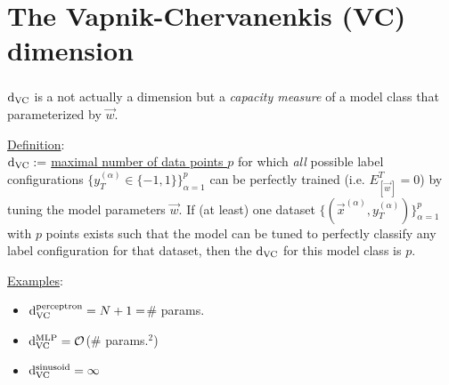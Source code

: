 \section{The Vapnik-Chervanenkis (VC) dimension}


\begin{frame}\frametitle{\secname}

$\mathrm{d}_{\mathrm{VC}}$ is a not actually a dimension but a \emph{capacity measure} 
of a model class that parameterized by $\vec w$.

\underline{Definition}:\\

$\mathrm{d}_{\mathrm{VC}} :=$ \underline{maximal number of data points $p$} for which \emph{all} possible label configurations $\{y_{T}^{(\alpha)} \in \{-1,1\}\}_{\alpha=1}^{p}$ can be perfectly trained (i.e. $E^{T}_{[\vec w]}=0$) by tuning the model parameters $\vec w$.
If (at least) one dataset $\{(\vec x^{(\alpha)}, y_{T}^{(\alpha)})\}_{\alpha=1}^{p}$ with $p$ points exists such that the model can be tuned to perfectly classify any label configuration for that dataset, then the $\mathrm{d}_{\mathrm{VC}}$ for this model class is $p$.






\end{frame}

\begin{frame}

\underline{Examples}:

\begin{itemize}
\item $\mathrm{d}_{\mathrm{VC}}^{\text{perceptron}} = N+1 = $\# params.
\item $\mathrm{d}_{\mathrm{VC}}^{\text{MLP}} = \mathcal{O}$(\# params.$^{2}$)
\item $\mathrm{d}_{\mathrm{VC}}^{\text{sinusoid}} = \infty$
\end{itemize}
    
\end{frame}



